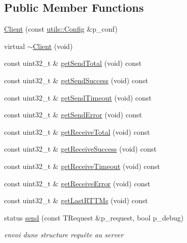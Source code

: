 \subsection*{Public Member Functions}
\begin{DoxyCompactItemize}
\item 
\hyperlink{classxtd_1_1network_1_1bip_1_1Client_a49c9e08bee4169c40c92d9870d882295}{Client} (const \hyperlink{classxtd_1_1network_1_1utils_1_1Config}{utils\+::\+Config} \&p\+\_\+conf)
\item 
virtual \hyperlink{classxtd_1_1network_1_1bip_1_1Client_ac16a5d30bae2e5ac5ae616034943d219}{$\sim$\+Client} (void)
\item 
const uint32\+\_\+t \& \hyperlink{classxtd_1_1network_1_1bip_1_1Client_ad9097285a9937b9b16922ea3f5154cd2}{get\+Send\+Total} (void) const 
\item 
const uint32\+\_\+t \& \hyperlink{classxtd_1_1network_1_1bip_1_1Client_ae0112d61b8a18823bffb8c7b3bde9b4d}{get\+Send\+Success} (void) const 
\item 
const uint32\+\_\+t \& \hyperlink{classxtd_1_1network_1_1bip_1_1Client_ad7b29723945a80df67837c41b4570272}{get\+Send\+Timeout} (void) const 
\item 
const uint32\+\_\+t \& \hyperlink{classxtd_1_1network_1_1bip_1_1Client_afa332d8733f5a96b85546de8dc37dffc}{get\+Send\+Error} (void) const 
\item 
const uint32\+\_\+t \& \hyperlink{classxtd_1_1network_1_1bip_1_1Client_af8c4e73103c9e483f78c9b62496daf47}{get\+Receive\+Total} (void) const 
\item 
const uint32\+\_\+t \& \hyperlink{classxtd_1_1network_1_1bip_1_1Client_a7fb2624e39723bae24d8286b98795e70}{get\+Receive\+Success} (void) const 
\item 
const uint32\+\_\+t \& \hyperlink{classxtd_1_1network_1_1bip_1_1Client_adfcc8fafdf138d104d78133ff5f419df}{get\+Receive\+Timeout} (void) const 
\item 
const uint32\+\_\+t \& \hyperlink{classxtd_1_1network_1_1bip_1_1Client_ab04f56d8e2cb6ac3d7fdaa2e1791c7cd}{get\+Receive\+Error} (void) const 
\item 
const uint32\+\_\+t \& \hyperlink{classxtd_1_1network_1_1bip_1_1Client_a44ee99fff5318cdd6e6b54b4b5e2f62f}{get\+Last\+R\+T\+T\+Ms} (void) const 
\item 
status \hyperlink{classxtd_1_1network_1_1bip_1_1Client_acda47c19d4fc71705f4db91226cec1b9}{send} (const T\+Request \&p\+\_\+request, bool p\+\_\+debug)
\begin{DoxyCompactList}\small\item\em envoi d\textquotesingle{}une structure requête au server \end{DoxyCompactList}\item 

\end{DoxyCompactItemize}
